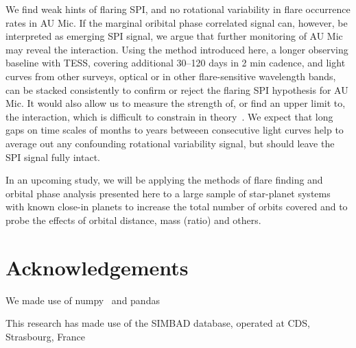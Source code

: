 \documentclass[fleqn,usenatbib,letters]{mnras}%
\begin{document}
We find weak hints of flaring SPI, and no rotational variability in flare occurrence rates in AU Mic. If the marginal oribital phase correlated signal can, however, be interpreted as emerging SPI signal, we argue that further monitoring of AU Mic may reveal the interaction. Using the method introduced here, a longer observing baseline with TESS, covering additional 30--120 days in 2 min cadence, and light curves from other surveys, optical or in other flare-sensitive wavelength bands, can be stacked consistently to confirm or reject the flaring SPI hypothesis for AU Mic. It would also allow us to measure the strength of, or find an upper limit to, the interaction, which is difficult to constrain in theory~\citep{strugarek2019}. We expect that long gaps on time scales of months to years betweeen consecutive light curves help to average out any confounding rotational variability signal, but should leave the SPI signal fully intact.

% 

In an upcoming study, we will be applying the methods of flare finding and orbital phase analysis presented here to a large sample of star-planet systems with known close-in planets to increase the total number of orbits covered and to probe the effects of orbital distance, mass (ratio) and others.
\section*{Acknowledgements}
We made use of numpy~\citep{numpy2020} and pandas~\citep{pandas2010,pandas2020software}

This research has made use of the SIMBAD database, operated at CDS, Strasbourg, France~\citep{wenger2000}


\end{document}

